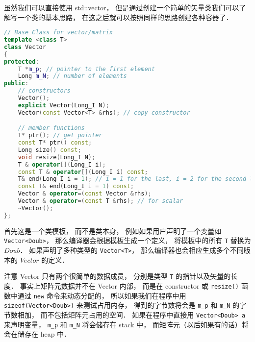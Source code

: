 
虽然我们可以直接使用 std::vector， 但是通过创建一个简单的矢量类我们可以了解写一个类的基本思路， 在这之后就可以按照同样的思路创建各种容器了．

\begin{lstlisting}[language=cpp]
// Base Class for vector/matrix
template <class T>
class Vector
{
protected:
	T *m_p; // pointer to the first element
	Long m_N; // number of elements
public:
	// constructors
	Vector();
	explicit Vector(Long_I N);
	Vector(const Vector<T> &rhs); // copy constructor

	// member functions
	T* ptr(); // get pointer
	const T* ptr() const;
	Long size() const;
	void resize(Long_I N);
	T & operator[](Long_I i);
	const T & operator[](Long_I i) const;
	T& end(Long_I i = 1); // i = 1 for the last, i = 2 for the second last...
	const T& end(Long_I i = 1) const;
	Vector & operator=(const Vector &rhs);
	Vector & operator=(const T &rhs); // for scalar
	~Vector();
};
\end{lstlisting}

首先这是一个类模板， 而不是类本身， 例如如果用户声明了一个变量如\lstinline{Vector<Doub>}， 那么编译器会根据模板生成一个定义， 将模板中的所有 \lstinline{T} 替换为 $Doub$． 如果声明了多种类型的 \lstinline{Vector<T>}， 那么编译器也会相应生成多个不同版本的 $Vector$ 的定义．

注意 Vector 只有两个很简单的数据成员， 分别是类型 \lstinline{T} 的指针以及矢量的长度． 事实上矩阵元数据并不在 Vector 内部， 而是在 constructor 或 \lstinline{resize()} 函数中通过 \lstinline{new} 命令来动态分配的， 所以如果我们在程序中用 \lstinline{sizeof(Vector<Doub>)} 来测试占用内存， 得到的字节数将会是 \lstinline{m_p} 和 \lstinline{m_N} 的字节数相加， 而不包括矩阵元占用的空间． 如果在程序中直接用 \lstinline{Vector<Doub> a} 来声明变量， \lstinline{m_p} 和 \lstinline{m_N} 将会储存在 stack 中， 而矩阵元（以后如果有的话）将会在储存在 heap 中．
